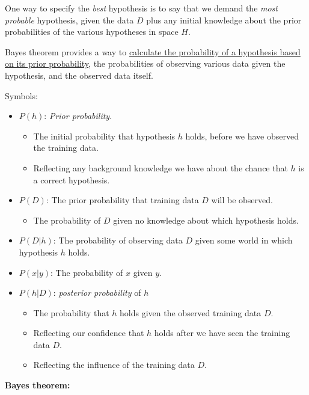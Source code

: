 One way to specify the \emph{best} hypothesis is to say that we demand
the \emph{most probable} hypothesis, given the data \(D\) plus any
initial knowledge about the prior probabilities of the various
hypotheses in space \(H\).

Bayes theorem provides a way to \underline{calculate the probability of a
hypothesis based on its prior probability}, the probabilities of
observing various data given the hypothesis, and the observed data
itself.

Symbols:

\begin{itemize}
\item
  \(P(h)\): \emph{Prior probability}.

  \begin{itemize}
  \item
    The initial probability that hypothesis \(h\) holds, before we have
    observed the training data.
  \item
    Reflecting any background knowledge we have about the chance that
    \(h\) is a correct hypothesis.
  \end{itemize}
\item
  \(P(D)\): The prior probability that training data \(D\) will be
  observed.

  \begin{itemize}
  \item
    The probability of \(D\) given no knowledge about which hypothesis
    holds.
  \end{itemize}
\item
  \(P(D|h)\): The probability of observing data \(D\) given some world
  in which hypothesis \(h\) holds.
\item
  \(P(x|y)\): The probability of \(x\) given \(y\).
\item
  \(P(h|D)\): \emph{posterior probability} of \(h\)

  \begin{itemize}
  \item
    The probability that \(h\) holds given the observed training data
    \(D\).
  \item
    Reflecting our confidence that \(h\) holds after we have seen the
    training data \(D\).
  \item
    Reflecting the influence of the training data \(D\).
  \end{itemize}
\end{itemize}

\textbf{Bayes theorem:}

